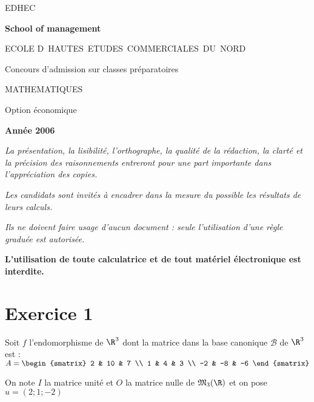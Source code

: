 \documentclass[11pt]{article}%
\begin{document}
\begin{center}
{\Huge EDHEC}

\textbf{School of management\vspace{3cm}}

{\large ECOLE D\E\ HAUTES\ ETUDES\ COMMERCIALES\ DU\ NORD}

{\large Concours d'admission sur classes préparatoires}

\underline{\hspace{3cm}}

{\LARGE MATHEMATIQUES}

{\large Option économique}

\textbf{Année 2006}{\large }
\end{center}

\noindent \textsl{La présentation, la lisibilité, l'orthographe, la
qualité
de la rédaction, la clarté et la précision des raisonnements entreront
pour
une part importante dans l'appréciation des copies.}

\noindent \textsl{Les candidats sont invités à encadrer dans la mesure
du
possible les résultats de leurs calculs.}

\noindent \textsl{Ils ne doivent faire usage d'aucun document : seule
l'utilisation d'une règle graduée est autorisée.\vspace{1cm}}

\noindent \textbf{L'utilisation de toute calculatrice et de tout
matériel électronique est interdite.}\vspace{1cm}

\section*{Exercice 1}

Soit $f$ l'endomorphisme de $\R^{3}$ dont la matrice dans la base
canonique $\mathcal{B}$ de $\R^{3}$ est : $A = 
\begin{smatrix}
2 & 10 & 7 \\
1 & 4 & 3 \\
-2 & -8 & -6
\end{smatrix}
$

On note $I$ la matrice unité et $O$ la matrice nulle de
$\mathfrak{M}_{3}(
\R)$ et on pose $u = (2;1;-2)$
\end{document}
